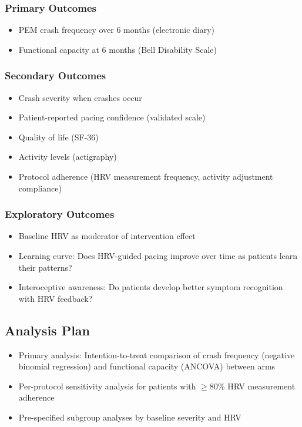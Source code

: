 \subsubsection{Primary Outcomes}
\begin{itemize}
    \item PEM crash frequency over 6 months (electronic diary)
    \item Functional capacity at 6 months (Bell Disability Scale)
\end{itemize}

\subsubsection{Secondary Outcomes}
\begin{itemize}
    \item Crash severity when crashes occur
    \item Patient-reported pacing confidence (validated scale)
    \item Quality of life (SF-36)
    \item Activity levels (actigraphy)
    \item Protocol adherence (HRV measurement frequency, activity adjustment compliance)
\end{itemize}

\subsubsection{Exploratory Outcomes}
\begin{itemize}
    \item Baseline HRV as moderator of intervention effect
    \item Learning curve: Does HRV-guided pacing improve over time as patients learn their patterns?
    \item Interoceptive awareness: Do patients develop better symptom recognition with HRV feedback?
\end{itemize}

\subsection{Analysis Plan}

\begin{itemize}
    \item Primary analysis: Intention-to-treat comparison of crash frequency (negative binomial regression) and functional capacity (ANCOVA) between arms
    \item Per-protocol sensitivity analysis for patients with $\geq$80\% HRV measurement adherence
    \item Pre-specified subgroup analyses by baseline severity and HRV
\end{itemize}

